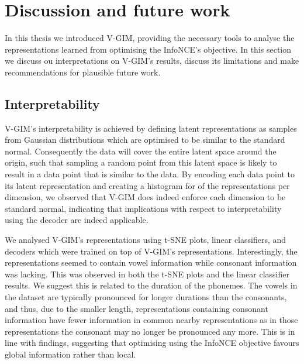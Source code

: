 \chapter{Discussion and future work}

	
In this thesis we introduced V-GIM, providing the necessary tools to analyse the representations learned from optimising the InfoNCE's objective. In this section we discuss ou interpretations on V-GIM's results, discuss its limitations and make recommendations for plausible future work.

\section{Interpretability}
	V-GIM's interpretability is achieved by defining latent representations as samples from Gaussian distributions which are optimised to be similar to the standard normal. Consequently the data will cover the entire latent space around the origin, such that sampling a random point from this latent space is likely to result in a data point that is similar to the data. By encoding each data point to its latent representation and creating a histogram for of the representations per dimension, we observed that V-GIM does indeed enforce each dimension to be standard normal, indicating that implications with respect to interpretability using the decoder are indeed applicable. 
	
	We analysed V-GIM's representations using t-SNE plots, linear classifiers, and decoders which were trained on top of V-GIM's representations. Interestingly, the representations seemed to contain vowel information while consonant information was lacking. This was observed in both the t-SNE plots and the linear classifier results. We suggest this is related to the duration of the phonemes. The vowels in the dataset are typically pronounced for longer durations than the consonants, and thus, due to the smaller length, representations containing consonant information have fewer information in common nearby representations as in those representations the consonant may no longer be pronounced any more. This is in line with \cite{lowePuttingEndEndtoEnd2020} findings, suggesting that optimising using the InfoNCE objective favours global information rather than local. 
	
